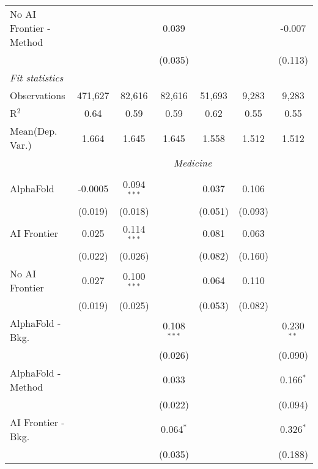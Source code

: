 \begin{tabular}{lcccccc}
   No AI Frontier - Method &               &               & 0.039         &               &               & -0.007\\   
                           &               &               & (0.035)       &               &               & (0.113)\\   
   \midrule
   \emph{Fit statistics}\\
   Observations            & 471,627       & 82,616        & 82,616        & 51,693        & 9,283         & 9,283\\  
   R$^2$                   & 0.64          & 0.59          & 0.59          & 0.62          & 0.55          & 0.55\\  
   
Mean(Dep. Var.) & 1.664 & 1.645 & 1.645 & 1.558 & 1.512 & 1.512 \\
 & \multicolumn{6}{c}{\textit{Medicine}} \\ \\
   AlphaFold               & -0.0005 & 0.094$^{***}$ &               & 0.037   & 0.106   &   \\   
                           & (0.019) & (0.018)       &               & (0.051) & (0.093) &   \\   
   AI Frontier             & 0.025   & 0.114$^{***}$ &               & 0.081   & 0.063   &   \\   
                           & (0.022) & (0.026)       &               & (0.082) & (0.160) &   \\   
   No AI Frontier          & 0.027   & 0.100$^{***}$ &               & 0.064   & 0.110   &   \\   
                           & (0.019) & (0.025)       &               & (0.053) & (0.082) &   \\   
   AlphaFold - Bkg.        &         &               & 0.108$^{***}$ &         &         & 0.230$^{**}$\\   
                           &         &               & (0.026)       &         &         & (0.090)\\   
   AlphaFold - Method      &         &               & 0.033         &         &         & 0.166$^{*}$\\   
                           &         &               & (0.022)       &         &         & (0.094)\\   
   AI Frontier - Bkg.      &         &               & 0.064$^{*}$   &         &         & 0.326$^{*}$\\   
                           &         &               & (0.035)       &         &         & (0.188)\\   

\end{tabular}
